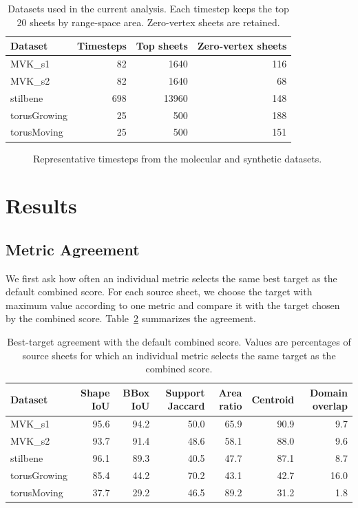 \begin{table}[t]
\caption{Datasets used in the current analysis. Each timestep keeps the top 20
sheets by range-space area. Zero-vertex sheets are retained.}
\label{tab:datasets}
\centering
\begin{tabular}{lrrr}
\toprule
Dataset & Timesteps & Top sheets & Zero-vertex sheets \\
\midrule
MVK\_s1 & 82 & 1640 & 116 \\
MVK\_s2 & 82 & 1640 & 68 \\
stilbene & 698 & 13960 & 148 \\
torusGrowing & 25 & 500 & 188 \\
torusMoving & 25 & 500 & 151 \\
\bottomrule
\end{tabular}
\end{table}

\begin{figure}[t]
  \caption{Representative timesteps from the molecular and synthetic datasets.}
  \label{fig:datasets}
\end{figure}

\section{Results}

\subsection{Metric Agreement}

We first ask how often an individual metric selects the same best target as the
default combined score. For each source sheet, we choose the target with maximum
value according to one metric and compare it with the target chosen by the
combined score. Table~\ref{tab:metric-agreement} summarizes the agreement.

\begin{table}[t]
\caption{Best-target agreement with the default combined score. Values are
percentages of source sheets for which an individual metric selects the same
target as the combined score.}
\label{tab:metric-agreement}
\centering
\begin{tabular}{lrrrrrr}
\toprule
Dataset & Shape IoU & BBox IoU & Support Jaccard & Area ratio & Centroid & Domain overlap \\
\midrule
MVK\_s1 & 95.6 & 94.2 & 50.0 & 65.9 & 90.9 & 9.7 \\
MVK\_s2 & 93.7 & 91.4 & 48.6 & 58.1 & 88.0 & 9.6 \\
stilbene & 96.1 & 89.3 & 40.5 & 47.7 & 87.1 & 8.7 \\
torusGrowing & 85.4 & 44.2 & 70.2 & 43.1 & 42.7 & 16.0 \\
torusMoving & 37.7 & 29.2 & 46.5 & 89.2 & 31.2 & 1.8 \\
\bottomrule
\end{tabular}
\end{table}

